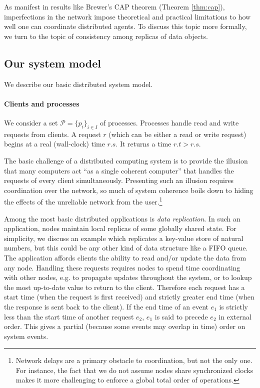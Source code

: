 As manifest in results like Brewer's CAP theorem (Theorem
\ref{thm:cap}), imperfections in the network impose theoretical and
practical limitations to how well one can coordinate distributed
agents. To discuss this topic more formally, we turn to the topic of
consistency among replicas of data objects.

\subsection{Our system model}
\label{subsec:system_model}

We describe our basic distributed system model.

\paragraph{Clients and processes}

We consider a set $\mathcal{P} = \{p_i\}_{i \in I}$ of
processes. Processes handle read and write requests from clients. A
request $r$ (which can be either a read or write request) begins at a
real (wall-clock) time $r.s$. It returns a time $r.t > r.s$.

The basic challenge of a distributed computing system is to provide
the illusion that many computers act ``as a single coherent computer''
\cite{TanenbaumSteen07} that handles the requests of every client
simultaneously. Presenting such an illusion requires coordination over
the network, so much of system coherence boils down to hiding the
effects of the unreliable network from the user.\footnote{Network
delays are a primary obstacle to coordination, but not the only
one. For instance, the fact that we do not assume nodes share
synchronized clocks makes it more challenging to enforce a global
total order of operations.}

Among the most basic distributed applications is \emph{data
replication}. In such an application, nodes maintain local replicas of
some globally shared state. For simplicity, we discuss an example
which replicates a key-value store of natural numbers, but this could
be any other kind of data structure like a FIFO queue. The application
affords clients the ability to read and/or update the data from any
node. Handling these requests requires nodes to spend time
coordinating with other nodes, e.g. to propagate updates throughout
the system, or to lookup the most up-to-date value to return to the
client. Therefore each request has a start time (when the request is
first received) and strictly greater end time (when the response is
sent back to the client). If the end time of an event $e_1$ is
strictly less than the start time of another request $e_2$, $e_1$ is
said to precede $e_2$ in external order. This gives a partial (because
some events may overlap in time) order on system events.

